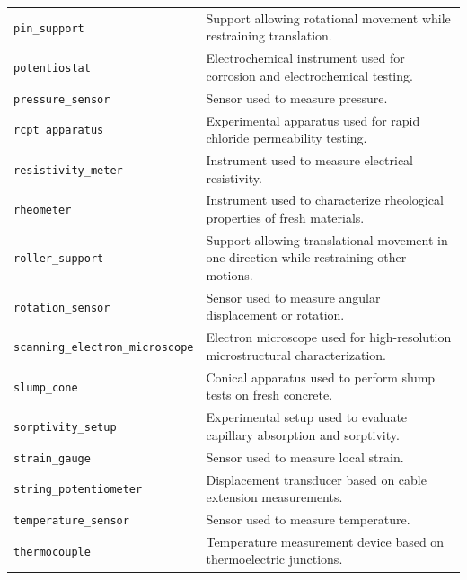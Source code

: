 \documentclass[11pt]{book}
\begin{document}
{\begin{longtable}{p{}p{}}
\texttt{pin\_support} &
Support allowing rotational movement while restraining translation. \\

\texttt{potentiostat} &
Electrochemical instrument used for corrosion and electrochemical testing. \\

\texttt{pressure\_sensor} &
Sensor used to measure pressure. \\

\texttt{rcpt\_apparatus} &
Experimental apparatus used for rapid chloride permeability testing. \\

\texttt{resistivity\_meter} &
Instrument used to measure electrical resistivity. \\

\texttt{rheometer} &
Instrument used to characterize rheological properties of fresh materials. \\

\texttt{roller\_support} &
Support allowing translational movement in one direction while restraining other motions. \\

\texttt{rotation\_sensor} &
Sensor used to measure angular displacement or rotation. \\

\texttt{scanning\_electron\_microscope} &
Electron microscope used for high-resolution microstructural characterization. \\

\texttt{slump\_cone} &
Conical apparatus used to perform slump tests on fresh concrete. \\

\texttt{sorptivity\_setup} &
Experimental setup used to evaluate capillary absorption and sorptivity. \\

\texttt{strain\_gauge} &
Sensor used to measure local strain. \\

\texttt{string\_potentiometer} &
Displacement transducer based on cable extension measurements. \\

\texttt{temperature\_sensor} &
Sensor used to measure temperature. \\

\texttt{thermocouple} &
Temperature measurement device based on thermoelectric junctions. \\


\end{longtable}}
\end{document}
